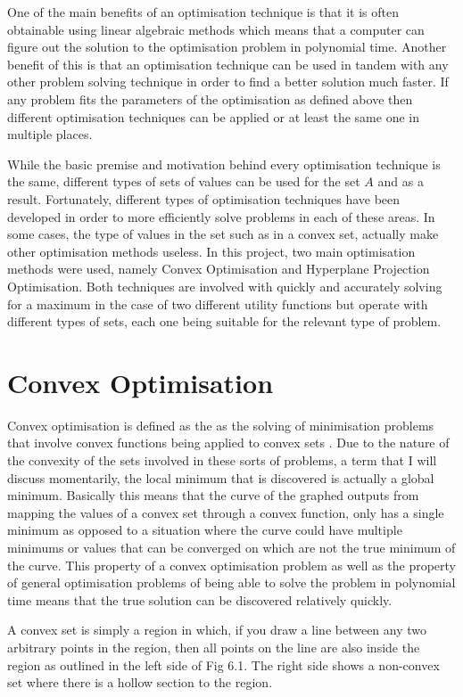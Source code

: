 \documentclass[a4paper, notitlepage]{report}
\begin{document}
One of the main benefits of an optimisation technique is that it is often
obtainable using linear algebraic methods which means that a computer can figure
out the solution to the optimisation problem in polynomial time. Another benefit
of this is that an optimisation technique can be used in tandem with any other
problem solving technique in order to find a better solution much faster. If any
problem fits the parameters of the optimisation as defined above then different
optimisation techniques can be applied or at least the same one in multiple
places.

While the basic premise and motivation behind every optimisation technique is
the same, different types of sets of values can be used for the set \(A\) and as a
result. Fortunately, different types of optimisation techniques have been
developed in order to more efficiently solve problems in each of these areas. In
some cases, the type of values in the set such as in a convex set, actually make
other optimisation methods useless. In this project, two main optimisation
methods were used, namely Convex Optimisation and Hyperplane Projection
Optimisation. Both techniques are involved with quickly and accurately solving
for a maximum in the case of two different utility functions but operate with
different types of sets, each one being suitable for the relevant type of problem.
\section{Convex Optimisation}
\label{sec:org509180a}
Convex optimisation is defined as the as the solving of minimisation problems
that involve convex functions being applied to convex sets \cite{boyd2004convex}.
Due to the nature of the convexity of the sets involved in these sorts of
problems, a term that I will discuss momentarily, the local minimum that is
discovered is actually a global minimum. Basically this means that the curve of
the graphed outputs from mapping the values of a convex set through a convex
function, only has a single minimum as opposed to a situation where the curve
could have multiple minimums or values that can be converged on which are not
the true minimum of the curve. This property of a convex optimisation problem as
well as the property of general optimisation problems of being able to solve the
problem in polynomial time means that the true solution can be discovered
relatively quickly.

A convex set is simply a region in which, if you draw a line between any two
arbitrary points in the region, then all points on the line are also inside the
region as outlined in the left side of Fig 6.1. The right side shows a
non-convex set where there is a hollow section to the region.
\end{document}
